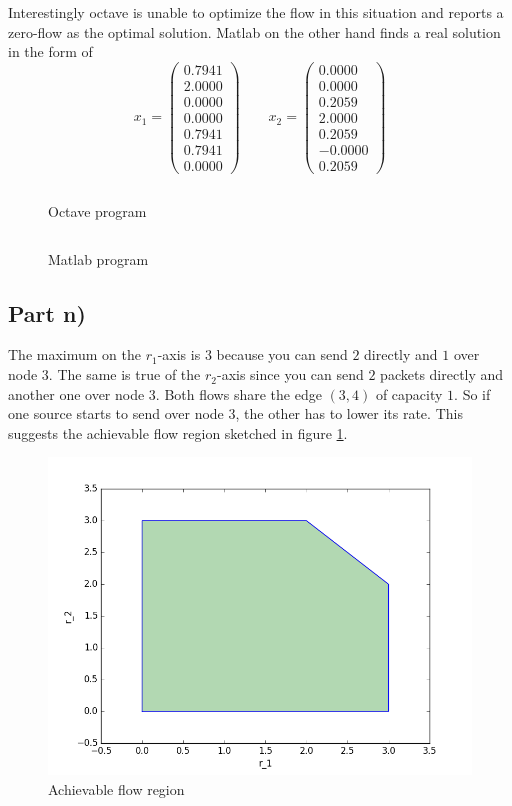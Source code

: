 \documentclass[10pt,a4paper]{article}
\begin{document}
Interestingly octave is unable to optimize the flow in this situation and reports a zero-flow as the optimal solution.
Matlab on the other hand finds a real solution in the form of
\begin{equation*}
  x_{1} = \begin{pmatrix}
    0.7941\\
    2.0000\\
    0.0000\\
    0.0000\\
    0.7941\\
    0.7941\\
    0.0000
  \end{pmatrix}
  \qquad
  x_{2} = \begin{pmatrix}
    0.0000\\
    0.0000\\
    0.2059\\
    2.0000\\
    0.2059\\
    -0.0000\\
    0.2059
  \end{pmatrix}
\end{equation*}

\begin{figure}[h]
  \centering
  \inputminted{octave}{sheet-6/optimizeflow2.m}
  \caption{Octave program}
\end{figure}

\begin{figure}[h]
  \centering
  \inputminted{matlab}{sheet-6/optimizeflowmatlab.m}
  \caption{Matlab program}
\end{figure}

\subsection*{Part n)}

The maximum on the $r_{1}$-axis is $3$ because you can send $2$ directly and $1$ over node $3$.
The same is true of the $r_{2}$-axis since you can send $2$ packets directly and another one over node $3$.
Both flows share the edge $(3, 4)$ of capacity $1$.
So if one source starts to send over node $3$, the other has to lower its rate.
This suggests the achievable flow region sketched in figure \ref{fig:achievable-flow-region}.

\begin{figure}
  \centering
  \includegraphics[width=\textwidth]{sheet-6/achievable-region.png}
  \caption{Achievable flow region}
  \label{fig:achievable-flow-region}
\end{figure}
\end{document}

